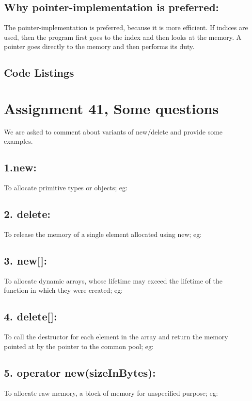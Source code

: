 \documentclass[11pt]{article}
\begin{document}
\subsection*{Why pointer-implementation is preferred:}
The pointer-implementation is preferred, because it is more efficient.
If indices are used, then the program first goes to the index and then
looks at the memory. A pointer goes directly to the memory and then performs
its duty.

\subsection*{Code Listings}



\section*{Assignment 41, Some questions}
We are asked to comment about variants of new/delete and provide some examples.
\subsection*{1.new:}
To allocate primitive types or objects; eg:

\subsection*{2. delete:}
To release the memory of a single element allocated using new; eg:

\subsection*{3. new[]:}
To allocate dynamic arrays, whose lifetime may exceed the lifetime of the function in which they were created; eg:

\subsection*{4. delete[]:}
To call the destructor for each element in the array and return the memory pointed at by the pointer to the common pool; eg:

\subsection*{5. operator new(sizeInBytes):}
To allocate raw memory, a block of memory for unspecified purpose; eg:

\end{document}
